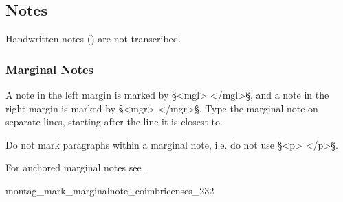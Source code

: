 



\tocspace
\subsection{Notes}

\begin{note}
Handwritten notes () are not transcribed. 
\end{note}

\subsubsection{Marginal Notes}
\label{section marginal notes}

\begin{mainrule}
A note in the left margin is marked by §<mgl> </mgl>§, and a note in the right margin is marked by §<mgr> </mgr>§. Type the marginal note on separate lines, starting after the line it is closest to. 
\end{mainrule}

\begin{clarification}
Do not mark paragraphs within a marginal note, i.e. do not use §<p> </p>§.
\end{clarification}

\begin{crossref}
For anchored marginal notes see .
\end{crossref}

\vspace{2mm}
\begin{sampleImage}{montag_mark_marginalnote_coimbricenses_232}

\notTranscribed

\vspace{2mm}
\end{sampleImage}

